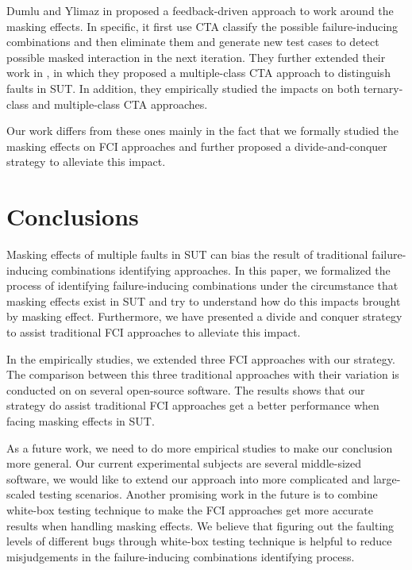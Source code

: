 \documentclass{sig-alternate}
\begin{document}
Dumlu and Ylimaz in \cite{dumlu2011feedback} proposed a feedback-driven approach to work around the masking effects. In specific, it first use CTA classify the possible failure-inducing combinations and then eliminate them and generate new test cases to detect possible masked interaction in the next iteration. They further extended their work in \cite{yilmaz2013reducing}, in which they proposed a multiple-class CTA approach to distinguish faults in SUT. In addition, they empirically studied the impacts on both ternary-class and multiple-class CTA approaches.

Our work differs from these ones mainly in the fact that we formally studied the masking effects on FCI approaches and further proposed a divide-and-conquer strategy to alleviate this impact.

\section{Conclusions}
Masking effects of multiple faults in SUT can bias the result of traditional failure-inducing combinations identifying approaches. In this paper, we formalized the process of identifying failure-inducing combinations under the circumstance that masking effects exist in SUT and try to understand how do this impacts brought by masking effect. Furthermore, we have presented a divide and conquer strategy to assist traditional FCI approaches to alleviate this impact. 


In the empirically studies, we extended three FCI approaches with our strategy. The comparison between this three traditional approaches with their variation is conducted on on several open-source software. The results shows that our strategy do assist traditional FCI approaches get a better performance when facing masking effects in SUT.

As a future work, we need to do more empirical studies to make our conclusion more general. Our current experimental subjects are several middle-sized software, we would like to extend our approach into more complicated and large-scaled testing scenarios. Another promising work in the future is to combine white-box testing technique to make the FCI approaches get more accurate results when handling masking effects. We believe that figuring out the faulting levels of different bugs through white-box testing technique is helpful to reduce misjudgements in the failure-inducing combinations identifying process. 
\end{document}
